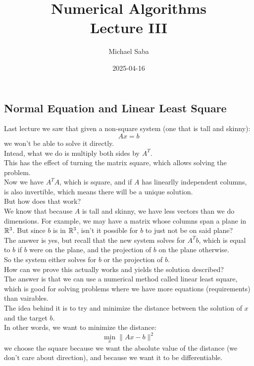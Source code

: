 \documentclass[12pt]{article}
\title{%
    \Huge Numerical Algorithms \\
    \Large Lecture III
}
\date{2025-04-16}
\author{Michael Saba}
\begin{document}
\maketitle
\newpage
\setlength{\parindent}{0pt}

\subsection*{Normal Equation
and Linear Least Square}

Last lecture we saw that given a non-square
system (one that is tall and skinny):
\[ Ax = b \]
we won't be able to solve it directly. \\
Intead, what we do is
multiply both sides by $A^T$. \\
This has the effect of turning the matrix
square, which allows solving the
problem. \\
Now we have $A^TA$, which is square,
and if $A$ has linearlly independent
columns, is also invertible,
which means there will be a unique
solution. \\
But how does that work? \\
We know that because $A$
is tall and skinny, we have less
vectors than we do dimensions. 
For example, we may have a matrix
whose columns span a plane in $\mathbb{R}^3$.
But since $b$ is in $\mathbb{R}^3$,
isn't it possible for $b$ to just not
be on said plane? \\
The answer is yes, but
recall that the new system solves
for $A^Tb$,
which is equal to $b$
if $b$ were on the plane,
and the projection of $b$
on the plane otherwise. \\
So the system either solves
for $b$ or the projection of $b$. \\

How can we prove this actually works
and yields the solution described? \\
The answer is that we can use a numerical
method called linear least square,
which is good for solving problems
where we have more equations (requirements)
than vairables. \\
The idea behind it is to try and minimize
the distance between the solution
of $x$ and the target $b$. \\
In other words, we want to minimize
the distance:
\[ \min_x \| Ax - b \|^2 \]
we choose the square because we want
the absolute value of the distance
(we don't care about direction),
and because we want it to be differentiable. \\
\end{document}
